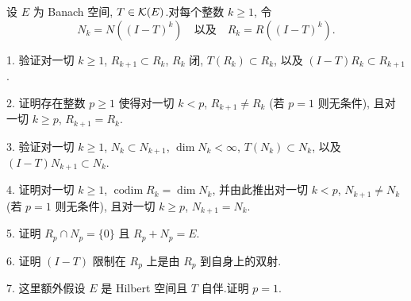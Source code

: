 \begin{problem}
\label{prob:36}
设 $E$ 为 Banach 空间, $T\in\mathcal{K}(E)$.对每个整数 $k\ge1$, 令
\begin{equation*}
N_k=N((I-T)^k)\quad\text{以及}\quad R_k=R((I-T)^k).
\end{equation*}

1. 验证对一切 $k\ge1$, $R_{k+1}\subset R_k$, $R_k$ 闭, $T(R_k)\subset R_k$, 以及
$(I-T)R_k\subset R_{k+1}$.

2. 证明存在整数 $p\ge1$ 使得对一切 $k<p$, $R_{k+1}\ne R_k$ (若 $p=1$ 则无条件),
且对一切 $k\ge p$, $R_{k+1}=R_k$.

3. 验证对一切 $k\ge1$, $N_k\subset N_{k+1}$, $\dim N_k<\infty$, $T(N_k)\subset N_k$,
以及 $(I-T)N_{k+1}\subset N_k$.

4. 证明对一切 $k\ge1$, $\operatorname{codim}R_k=\dim N_k$, 并由此推出对一切 $k<p$,
$N_{k+1}\ne N_k$ (若 $p=1$ 则无条件), 且对一切 $k\ge p$, $N_{k+1}=N_k$.

5. 证明 $R_p\cap N_p=\{0\}$ 且 $R_p+N_p=E$.

6. 证明 $(I-T)$ 限制在 $R_p$ 上是由 $R_p$ 到自身上的双射.

7. 这里额外假设 $E$ 是 Hilbert 空间且 $T$ 自伴.证明 $p=1$.
\end{problem}

